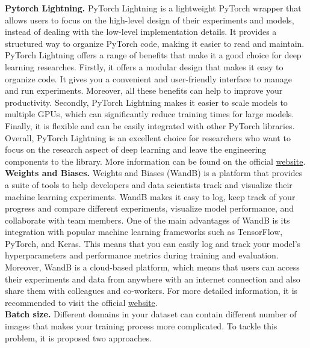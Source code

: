 \textbf{Pytorch Lightning.} PyTorch Lightning is a lightweight PyTorch wrapper that allows users to focus on the high-level design of their experiments and models, instead of dealing with the low-level implementation details. It provides a structured way to organize PyTorch code, making it easier to read and maintain.\\

PyTorch Lightning offers a range of benefits that make it a good choice for deep learning researches. Firstly, it offers a modular design that makes it easy to organize code. It gives you a convenient and user-friendly interface to manage and run experiments. Moreover, all these benefits can help to improve your productivity. Secondly, PyTorch Lightning makes it easier to scale models to multiple GPUs, which can significantly reduce training times for large models. Finally, it is flexible and can be easily integrated with other PyTorch libraries. Overall, PyTorch Lightning is an excellent choice for researchers who want to focus on the research aspect of deep learning and leave the engineering components to the library. More information can be found on the official \href{https://www.pytorchlightning.ai/index.html}{website}.\\

\textbf{Weights and Biases.} Weights and Biases (WandB) is a platform  that provides a suite of tools to help developers and data scientists track and visualize their machine learning experiments. WandB makes it easy to log, keep track of your progress and compare different experiments, visualize model performance, and collaborate with team members. One of the main advantages of WandB is its integration with popular machine learning frameworks such as TensorFlow, PyTorch, and Keras. This means that you can easily log and track your model's hyperparameters and performance metrics during training and evaluation. Moreover, WandB is a cloud-based platform, which means that users can access their experiments and data from anywhere with an internet connection and also share them with colleagues and co-workers. For more detailed information, it is recommended to visit the official \href{https://wandb.ai/site}{website}.\\ 

\textbf{Batch size.} Different domains in your dataset can contain different number of images that makes your training process more complicated. To tackle this problem, it is proposed two approaches. \\


